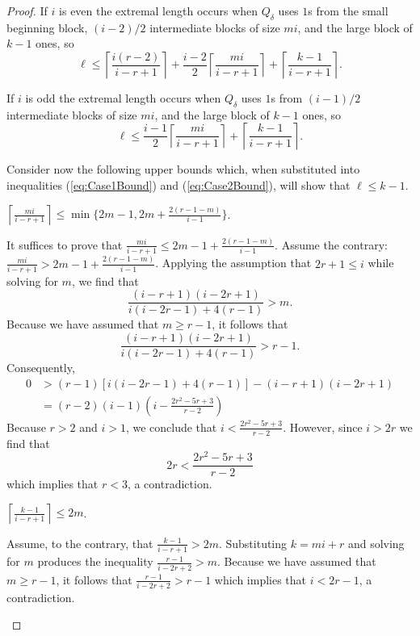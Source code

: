 \begin{proof}
If $i$ is even the extremal length occurs when $Q_\delta$ uses $1$s from the small beginning block, $(i-2)/2$ intermediate blocks of size $mi$, and the large block of $k-1$ ones, so
\begin{equation} \label{eq:Case1Bound}
\ell \leq \left\lceil \frac{i(r-2)}{i - r + 1} \right\rceil + \frac{i-2}{2} \left\lceil \frac{mi}{i - r + 1} \right\rceil + \left\lceil \frac{k-1}{i - r + 1} \right\rceil. 
\end{equation}

If $i$ is odd the extremal length occurs when $Q_\delta$ uses $1$s from $(i-1)/2$ intermediate blocks of size $mi$, and the large block of $k-1$ ones, so
\begin{equation} \label{eq:Case2Bound}
\ell \leq \frac{i-1}{2} \left\lceil \frac{mi}{i - r + 1} \right\rceil + \left\lceil \frac{k-1}{i - r + 1} \right\rceil. 
\end{equation}

Consider now the following upper bounds which, when substituted into inequalities (\ref{eq:Case1Bound}) and (\ref{eq:Case2Bound}), will show that $\ell \leq k-1$.

\begin{claim}[Bound 1]$\left\lceil \frac{mi}{i - r + 1} \right\rceil \leq \min\{2m - 1,2m + \frac{2(r-1-m)}{i-1}\}$.

It suffices to prove that $\frac{mi}{i - r + 1} \leq 2m - 1 + \frac{2(r-1-m)}{i-1}$. Assume the contrary: $\frac{mi}{i - r + 1} > 2m - 1 + \frac{2(r-1-m)}{i-1}$. Applying the assumption that $2r + 1 \leq i$ while solving for $m$, we find that \[\frac{(i-r+1)(i-2r+1)}{i(i-2r-1)+4(r-1)} > m.\] Because we have assumed that $m \geq r-1$, it follows that \[\frac{(i-r+1)(i-2r+1)}{i(i-2r-1)+4(r-1)} > r-1.\] Consequently,
	\begin{align*}
		0	&> \left(r-1\right)\left[i(i-2r-1)+4(r-1)\right] - (i-r+1)(i-2r+1)\\
     		&= \left(r-2\right)\left(i-1\right)\left(i - \frac{2r^2 - 5r + 3}{r-2}\right)
	\end{align*}
Because $r > 2$ and $i > 1$, we conclude that $i < \frac{2r^2 - 5r + 3}{r-2}$. However, since $i > 2r$ we find that \[ 2r < \frac{2r^2 - 5r + 3}{r-2} \] which implies that $r < 3$, a contradiction.
\end{claim}

\begin{claim}[Bound 2]$\left\lceil \frac{k-1}{i - r + 1} \right\rceil \leq 2m$.

Assume, to the contrary, that $\frac{k-1}{i - r + 1} > 2m$. Substituting $k=mi+r$ and solving for $m$ produces the inequality $\frac{r-1}{i-2r+2} > m$. Because we have assumed that $m \geq r-1$, it follows that $\frac{r-1}{i-2r+2} > r-1$ which implies that $i < 2r-1$, a contradiction.
\end{claim}


\end{proof}
